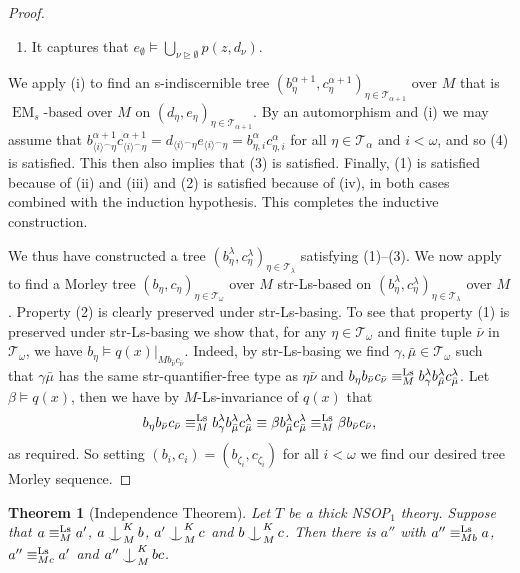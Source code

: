 \documentclass[a4paper, reqno]{amsart}
\newtheorem{theorem}{Theorem}[section]
\theoremstyle{definition}
\theoremstyle{repeat}
\newcommand{\T}{\mathcal{T}}
\DeclareMathOperator{\EM}{EM}
\newcommand{\equivls}{\equiv^\textup{Ls}}
\def\Ind#1#2{#1\setbox0=\hbox{$#1x$}\kern\wd0\hbox to 0pt{\hss$#1\mid$\hss}
\lower.9\ht0\hbox to 0pt{\hss$#1\smile$\hss}\kern\wd0}
\def\ind{\mathop{\mathpalette\Ind{}}}
\begin{document}
\begin{proof}
\begin{enumerate}[label=(\roman*)]
\item It captures that $e_\emptyset \models \bigcup_{\nu \unrhd \emptyset} p(z, d_\nu)$.
\end{enumerate}
We apply (i) to find an s-indiscernible tree $(b^{\alpha+1}_\eta, c^{\alpha+1}_\eta)_{\eta \in \T_{\alpha+1}}$ over $M$ that is $\EM_s$-based over $M$ on $(d_\eta, e_\eta)_{\eta \in \T_{\alpha+1}}$. By an automorphism and (i) we may assume that $b^{\alpha+1}_{\langle i \rangle^\frown \eta} c^{\alpha+1}_{\langle i \rangle^\frown \eta} = d_{\langle i \rangle^\frown \eta} e_{\langle i \rangle^\frown \eta} = b^\alpha_{\eta,i} c^\alpha_{\eta,i}$ for all $\eta \in \T_\alpha$ and $i < \omega$, and so (4) is satisfied. This then also implies that (3) is satisfied. Finally, (1) is satisfied because of (ii) and (iii) and (2) is satisfied because of (iv), in both cases combined with the induction hypothesis. This completes the inductive construction.

We thus have constructed a tree $(b^\lambda_\eta, c^\lambda_\eta)_{\eta \in \T_\lambda}$ satisfying (1)--(3). We now apply  to find a Morley tree $(b_\eta, c_\eta)_{\eta \in \T_\omega}$ over $M$ str-Ls-based on $(b^\lambda_\eta, c^\lambda_\eta)_{\eta \in \T_\lambda}$ over $M$. Property (2) is clearly preserved under str-Ls-basing. To see that property (1) is preserved under str-Ls-basing we show that, for any $\eta \in \T_\omega$ and finite tuple $\bar{\nu}$ in $\T_\omega$, we have $b_\eta \models q(x)|_{M b_{\bar{\nu}} c_{\bar{\nu}}}$. Indeed, by str-Ls-basing we find $\gamma, \bar{\mu} \in \T_\omega$ such that $\gamma \bar{\mu}$ has the same str-quantifier-free type as $\eta \bar{\nu}$ and $b_\eta b_{\bar{\nu}} c_{\bar{\nu}} \equivls_M b^\lambda_\gamma b^\lambda_{\bar{\mu}} c^\lambda_{\bar{\mu}}$. Let $\beta \models q(x)$, then we have by $M$-Ls-invariance of $q(x)$ that
\[
b_\eta b_{\bar{\nu}} c_{\bar{\nu}} \equivls_M b^\lambda_\gamma b^\lambda_{\bar{\mu}} c^\lambda_{\bar{\mu}} \equiv \beta b^\lambda_{\bar{\mu}} c^\lambda_{\bar{\mu}} \equivls_M \beta b_{\bar{\nu}} c_{\bar{\nu}},
\]
as required. So setting $(b_i, c_i) = (b_{\zeta_i}, c_{\zeta_i})$ for all $i < \omega$ we find our desired tree Morley sequence.
\end{proof}
\begin{theorem}[Independence Theorem]
Let $T$ be a thick NSOP$_1$ theory. Suppose that $a \equivls_M a'$, $a \ind^K_M b$, $a' \ind^K_M c$ and $b \ind^K_M c$. Then there is $a''$ with $a'' \equivls_{Mb} a$, $a'' \equivls_{Mc} a'$ and $a'' \ind^K_M bc$.
\end{theorem}
\end{document}
